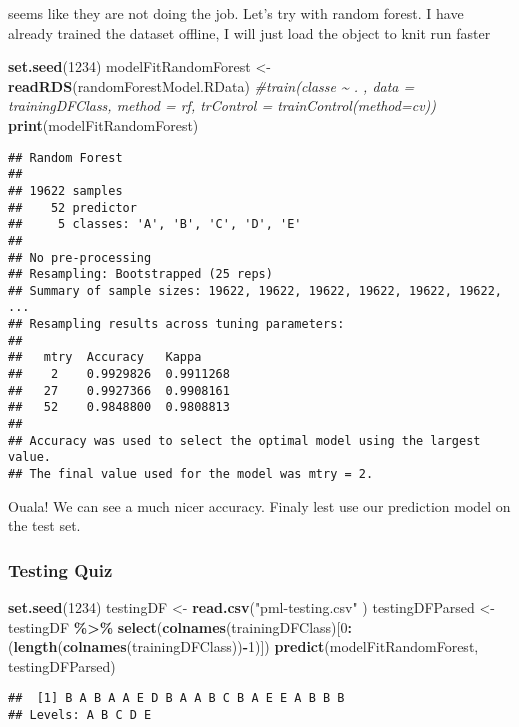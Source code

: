\documentclass[
]{article}
\newenvironment{Shaded}{\begin{snugshade}}{\end{snugshade}}
\newcommand{\CommentTok}[1]{\textcolor[rgb]{0.56,0.35,0.01}{\textit{#1}}}
\newcommand{\DecValTok}[1]{\textcolor[rgb]{0.00,0.00,0.81}{#1}}
\newcommand{\FunctionTok}[1]{\textcolor[rgb]{0.13,0.29,0.53}{\textbf{#1}}}
\newcommand{\NormalTok}[1]{#1}
\newcommand{\OtherTok}[1]{\textcolor[rgb]{0.56,0.35,0.01}{#1}}
\newcommand{\SpecialCharTok}[1]{\textcolor[rgb]{0.81,0.36,0.00}{\textbf{#1}}}
\newcommand{\StringTok}[1]{\textcolor[rgb]{0.31,0.60,0.02}{#1}}
\begin{document}
seems like they are not doing the job. Let's try with random forest. I
have already trained the dataset offline, I will just load the object to
knit run faster

\begin{Shaded}
\begin{Highlighting}[]
\FunctionTok{set.seed}\NormalTok{(}\DecValTok{1234}\NormalTok{)}
\NormalTok{modelFitRandomForest }\OtherTok{\textless{}{-}}  \FunctionTok{readRDS}\NormalTok{(}\StringTok{\textquotesingle{}randomForestModel.RData\textquotesingle{}}\NormalTok{) }\CommentTok{\#train(classe \textasciitilde{} . , data = trainingDFClass, method = \textquotesingle{}rf\textquotesingle{},  trControl = trainControl(method=\textquotesingle{}cv\textquotesingle{}))}
\FunctionTok{print}\NormalTok{(modelFitRandomForest)}
\end{Highlighting}
\end{Shaded}

\begin{verbatim}
## Random Forest 
## 
## 19622 samples
##    52 predictor
##     5 classes: 'A', 'B', 'C', 'D', 'E' 
## 
## No pre-processing
## Resampling: Bootstrapped (25 reps) 
## Summary of sample sizes: 19622, 19622, 19622, 19622, 19622, 19622, ... 
## Resampling results across tuning parameters:
## 
##   mtry  Accuracy   Kappa    
##    2    0.9929826  0.9911268
##   27    0.9927366  0.9908161
##   52    0.9848800  0.9808813
## 
## Accuracy was used to select the optimal model using the largest value.
## The final value used for the model was mtry = 2.
\end{verbatim}

Ouala! We can see a much nicer accuracy. Finaly lest use our prediction
model on the test set.

\subsubsection{Testing Quiz}\label{testing-quiz}

\begin{Shaded}
\begin{Highlighting}[]
\FunctionTok{set.seed}\NormalTok{(}\DecValTok{1234}\NormalTok{)}
\NormalTok{testingDF }\OtherTok{\textless{}{-}} \FunctionTok{read.csv}\NormalTok{(}\StringTok{"pml{-}testing.csv"}\NormalTok{ )}
\NormalTok{testingDFParsed }\OtherTok{\textless{}{-}}\NormalTok{ testingDF }\SpecialCharTok{\%\textgreater{}\%} \FunctionTok{select}\NormalTok{(}\FunctionTok{colnames}\NormalTok{(trainingDFClass)[}\DecValTok{0}\SpecialCharTok{:}\NormalTok{(}\FunctionTok{length}\NormalTok{(}\FunctionTok{colnames}\NormalTok{(trainingDFClass))}\SpecialCharTok{{-}}\DecValTok{1}\NormalTok{)])}
\FunctionTok{predict}\NormalTok{(modelFitRandomForest, testingDFParsed)}
\end{Highlighting}
\end{Shaded}

\begin{verbatim}
##  [1] B A B A A E D B A A B C B A E E A B B B
## Levels: A B C D E
\end{verbatim}
\end{document}
